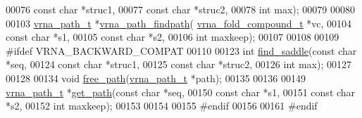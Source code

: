 \begin{DoxyCode}
00076                               \textcolor{keyword}{const} \textcolor{keywordtype}{char}            *struc1,
00077                               \textcolor{keyword}{const} \textcolor{keywordtype}{char}            *struc2,
00078                               \textcolor{keywordtype}{int}                   max);
00079 
00080 
00103 \hyperlink{group__direct__paths_structvrna__path__s}{vrna\_path\_t} *\hyperlink{group__direct__paths_ga5e1f97f58adc65016a8df88802dc16b5}{vrna\_path\_findpath}(
      \hyperlink{group__fold__compound_structvrna__fc__s}{vrna\_fold\_compound\_t}  *vc,
00104                                 \textcolor{keyword}{const} \textcolor{keywordtype}{char}            *s1,
00105                                 \textcolor{keyword}{const} \textcolor{keywordtype}{char}            *s2,
00106                                 \textcolor{keywordtype}{int}                   maxkeep);
00107 
00108 
00109 \textcolor{preprocessor}{#ifdef VRNA\_BACKWARD\_COMPAT}
00110 
00123 \textcolor{keywordtype}{int} \hyperlink{group__direct__paths_gad0e14268e309af773ecd1fce6244ee50}{find\_saddle}(\textcolor{keyword}{const} \textcolor{keywordtype}{char}  *seq,
00124                 \textcolor{keyword}{const} \textcolor{keywordtype}{char}  *struc1,
00125                 \textcolor{keyword}{const} \textcolor{keywordtype}{char}  *struc2,
00126                 \textcolor{keywordtype}{int}         max);
00127 
00128 
00134 \textcolor{keywordtype}{void}    \hyperlink{group__direct__paths_ga9056421d716ae89f0ed3f107627f395b}{free\_path}(\hyperlink{group__direct__paths_structvrna__path__s}{vrna\_path\_t} *path);
00135 
00136 
00149 \hyperlink{group__direct__paths_structvrna__path__s}{vrna\_path\_t} *\hyperlink{group__direct__paths_ga0b22426253e190bd268f86b01b71220d}{get\_path}(\textcolor{keyword}{const} \textcolor{keywordtype}{char}  *seq,
00150                       \textcolor{keyword}{const} \textcolor{keywordtype}{char}  *s1,
00151                       \textcolor{keyword}{const} \textcolor{keywordtype}{char}  *s2,
00152                       \textcolor{keywordtype}{int}         maxkeep);
00153 
00154 
00155 \textcolor{preprocessor}{#endif}
00156 
00161 \textcolor{preprocessor}{#endif}
\end{DoxyCode}
